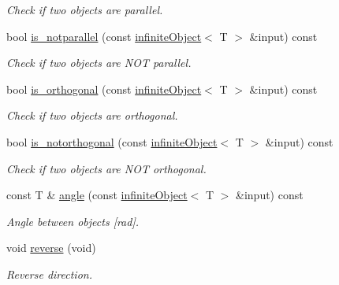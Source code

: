 \begin{DoxyCompactItemize}
\begin{DoxyCompactList}\small\item\em Check if two objects are parallel. \end{DoxyCompactList}\item 
bool \hyperlink{classddd_1_1infinite_object_ad4f312a6d767c5825632d8915a9f7dbc}{is\+\_\+notparallel} (const \hyperlink{classddd_1_1infinite_object}{infinite\+Object}$<$ T $>$ \&input) const
\begin{DoxyCompactList}\small\item\em Check if two objects are N\+OT parallel. \end{DoxyCompactList}\item 
bool \hyperlink{classddd_1_1infinite_object_a634f0db3a5447756901c43f8f3d20a8a}{is\+\_\+orthogonal} (const \hyperlink{classddd_1_1infinite_object}{infinite\+Object}$<$ T $>$ \&input) const
\begin{DoxyCompactList}\small\item\em Check if two objects are orthogonal. \end{DoxyCompactList}\item 
bool \hyperlink{classddd_1_1infinite_object_a1dbf3e37dc6f146f089c4c63c4704329}{is\+\_\+notorthogonal} (const \hyperlink{classddd_1_1infinite_object}{infinite\+Object}$<$ T $>$ \&input) const
\begin{DoxyCompactList}\small\item\em Check if two objects are N\+OT orthogonal. \end{DoxyCompactList}\item 
const T \& \hyperlink{classddd_1_1infinite_object_a2145eca21c4505c11d19badc25faaf85}{angle} (const \hyperlink{classddd_1_1infinite_object}{infinite\+Object}$<$ T $>$ \&input) const
\begin{DoxyCompactList}\small\item\em Angle between objects \mbox{[}rad\mbox{]}. \end{DoxyCompactList}\item 
\mbox{\label{classddd_1_1infinite_object_ae9f9826fd760a02b74604e63434b4211}} 
void \hyperlink{classddd_1_1infinite_object_ae9f9826fd760a02b74604e63434b4211}{reverse} (void)
\begin{DoxyCompactList}\small\item\em Reverse direction. \end{DoxyCompactList}\end{DoxyCompactItemize}


